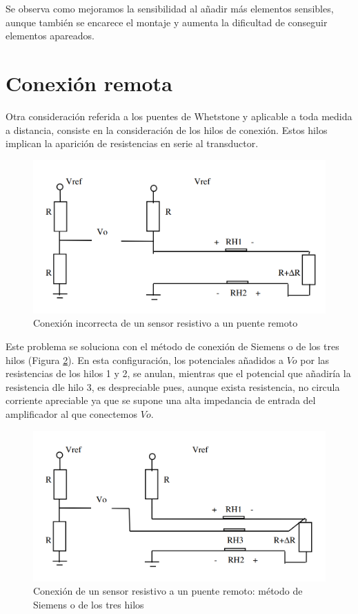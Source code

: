 Se observa como mejoramos la sensibilidad al añadir más elementos sensibles, aunque también se encarece el montaje y aumenta la dificultad de conseguir elementos apareados. 

\section{Conexión remota}

Otra consideración referida a los puentes de Whetstone y aplicable a toda medida a distancia, consiste en la consideración de los hilos de conexión. Estos hilos implican la aparición de resistencias en serie al transductor. 

\begin{figure}[H]
    \centering
    \includegraphics[width=0.5\linewidth]{Imagenes/Conexion 2 Hilos.png}
    \caption{Conexión incorrecta de un sensor resistivo a un puente remoto}
    \label{fig:2-hilos}
\end{figure}

Este problema se soluciona con el método de conexión de Siemens o de los tres hilos (Figura \ref{fig:3-hilos}). En esta configuración, los potenciales añadidos a $Vo$ por las resistencias de los hilos 1 y 2, se anulan, mientras que el potencial que añadiría la resistencia dle hilo 3, es despreciable pues, aunque exista resistencia, no circula corriente apreciable ya que se supone una alta impedancia de entrada del amplificador al que conectemos $Vo$.

\begin{figure}[H]
    \centering
    \includegraphics[width=0.5\linewidth]{Imagenes/Conexion 3 Hilos.png}
    \caption{Conexión de un sensor resistivo a un puente remoto: método de Siemens o de los tres hilos}
    \label{fig:3-hilos}
\end{figure}


